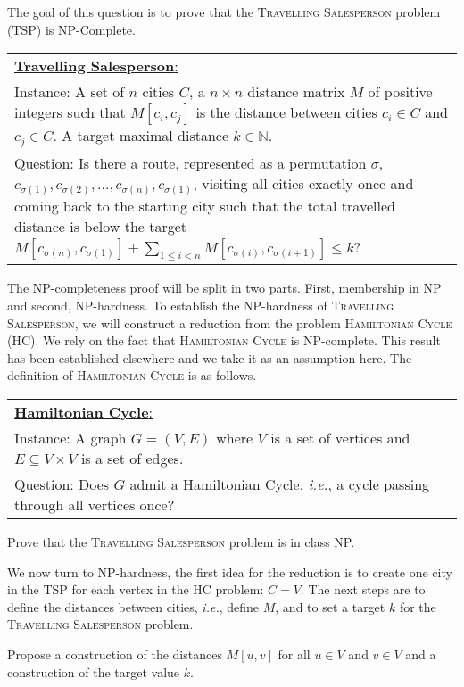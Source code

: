 \documentclass{article}
\newcommand{\decisionproblem}[3]{
\smallbreak
\noindent
\begin{tabular}{p{\columnwidth}}
\hline
\underline{\textbf{#1}:} \\
Instance: #2 \\
Question: #3 \\
\hline
\end{tabular}
\smallbreak}
\begin{document}
\newpage
\begin{Question}
The goal of this question is to prove that the \textsc{Travelling Salesperson} problem (TSP) is NP-Complete.
\decisionproblem{Travelling Salesperson}{
A set of $n$ cities $C$, a $n\times n$ distance matrix $M$ of positive integers such that $M[c_i, c_j]$ is the distance between cities $c_i \in C$ and $c_j \in C$.
A target maximal distance $k \in \mathbb{N}$.}{
Is there a route, represented as a permutation $\sigma$, $c_{\sigma(1)}, c_{\sigma(2)}, \dots, c_{\sigma(n)}, c_{\sigma(1)}$, visiting all cities exactly once and coming back to the starting city such that the total travelled distance is below the target $M[c_{\sigma(n)}, c_{\sigma(1)}] + \sum_{1 \leq i < n} M[c_{\sigma(i)}, c_{\sigma(i+1)}] \leq k$?}

The NP-completeness proof will be split in two parts. First, membership in NP and second, NP-hardness.
To establish the NP-hardness of \textsc{Travelling Salesperson}, we will construct a reduction from the problem \textsc{Hamiltonian Cycle} (HC).
We rely on the fact that \textsc{Hamiltonian Cycle} is NP-complete.
This result has been established elsewhere and we take it as an assumption here.
The definition of \textsc{Hamiltonian Cycle} is as follows.

\decisionproblem{Hamiltonian Cycle}{
A graph $G=(V, E)$ where $V$ is a set of vertices and $E \subseteq V\times V$ is a set of edges.}{%
Does $G$ admit a Hamiltonian Cycle, \emph{i.e.}, a cycle passing through all vertices once?
}

\begin{Subquestion}
Prove that the \textsc{Travelling Salesperson} problem is in class NP.
\begin{makespace}
\vspace{70mm}
\end{makespace}
\end{Subquestion}

We now turn to NP-hardness, the first idea for the reduction is to create one city in the TSP for each vertex in the HC problem: $C = V$.
The next steps are to define the distances between cities, \emph{i.e.}, define $M$, and to set a target $k$ for the \textsc{Travelling Salesperson} problem.
\begin{Subquestion}
Propose a construction of the distances $M[u, v]$ for all $u \in V$ and $v \in V$ and a construction of the target value $k$.
\begin{makespace}
\vspace{40mm}
\end{makespace}
\end{Subquestion}


\end{Question}
\end{document}

